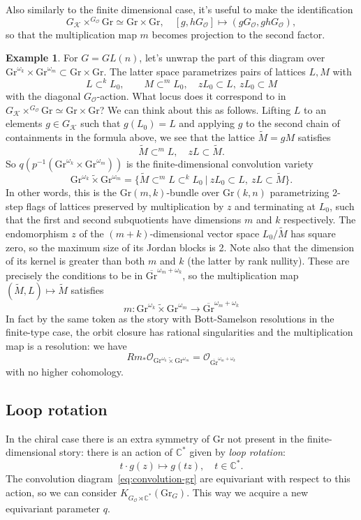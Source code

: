 \documentclass[11pt]{amsart}
\theoremstyle{definition}
\newtheorem{example}[dummy]{Example}
\newcommand{\bC}{\mathbb{C}}
\newcommand{\Kc}{\mathcal{K}}
\newcommand{\Gr}{\mathrm{Gr}}
\newcommand{\Oc}{\mathcal{O}}
\numberwithin{equation}{subsection}
\numberwithin{figure}{subsection}
\begin{document}
Also similarly to the finite dimensional case, it's useful to make the identification
$$
G_\Kc\times^{G_\Oc}\Gr \simeq \Gr\times \Gr, \quad [g,hG_\Oc]\mapsto (g G_\Oc, ghG_\Oc),
$$
so that the multiplication map $m$ becomes projection to the second factor.
\begin{example}
For $G=GL(n)$, let's unwrap the part of this diagram over $\Gr^{\omega_k}\times\Gr^{\omega_m}\subset\Gr\times\Gr$. The latter space parametrizes pairs of lattices $L,M$ with 
$$
 L\subset^k L_0,\qquad  M\subset^m L_0, \quad zL_0\subset L, ~zL_0\subset M
$$
with the diagonal $G_\Oc$-action. What locus does it correspond to in $G_\Kc\times^{G_\Oc}\Gr \simeq \Gr\times \Gr$? We can think about this as follows. Lifting $L$ to an elements $g\in G_\Kc$ such that $g(L_0)=L$ and applying $g$ to the second chain of containments in the formula above, we see that the lattice $\tilde{M}=gM$  satisfies
$$
\tilde{M}\subset^m L, \quad  zL\subset\tilde M.
$$
So $q(p^{-1}(\Gr^{\omega_k}\times\Gr^{\omega_m}))$ is the finite-dimensional convolution variety
$$
\Gr^{\omega_k}\widetilde\times \Gr^{\omega_m} = \{\tilde M \subset^m L\subset^k L_0 ~\big |~ zL_0\subset L,~ zL\subset \tilde{M}\}. 
$$
In other words, this is the $\Gr(m,k)$-bundle over $\Gr(k,n)$ parametrizing 2-step flags of lattices preserved by multiplication by $z$ and terminating at $L_0$, such that the first and second subquotients have dimensions $m$ and $k$ respectively. 
The endomorphism $z$ of the $(m+k)$-dimensional vector space $L_0/\tilde M$ has square zero, so the maximum size of its Jordan blocks is 2. Note also that the dimension of its kernel is greater than both $m$ and $k$ (the latter by rank nullity). These are precisely the conditions to be in $\overline{\Gr}^{\omega_m+\omega_k}$, so the multiplication map $(\tilde M,L)\mapsto \tilde M$ satisfies
$$
m:\Gr^{\omega_k}\widetilde\times \Gr^{\omega_m}\rightarrow \overline{\Gr}^{\omega_m+\omega_k}
$$
In fact by the same token as the story with Bott-Samelson resolutions in the finite-type case, the orbit closure has rational singularities and the multiplication map is a resolution: we have
$$
Rm_*\mathcal{O}_{\Gr^{\omega_k}\widetilde\times \Gr^{\omega_m}} = \Oc_{\overline{\Gr}^{\omega_m+\omega_k}}
$$
with no higher cohomology.
\end{example}

\subsection{Loop rotation} In the chiral case there is an extra symmetry of $\Gr$ not present in the finite-dimensional story: there is an action of $\bC^*$ given by \emph{loop rotation}:
$$
t\cdot g(z) \mapsto g(tz), \quad t\in \bC^*.
$$
The convolution diagram~\eqref{eq:convolution-gr} are equivariant with respect to this action, so we can consider $K_{G_\Oc\rtimes\bC^*}(\Gr_G)$. This way we acquire a new equivariant parameter $q$. 
\end{document}
